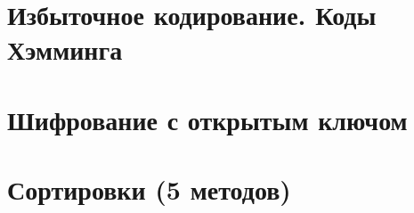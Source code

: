 \documentclass[12pt, fleqn]{article}
\begin{document}














\section{Избыточное кодирование. Коды Хэмминга}
\newpage

\section{Шифрование с открытым ключом}
\newpage

\section{Сортировки (5 методов)}
\newpage
\end{document}
